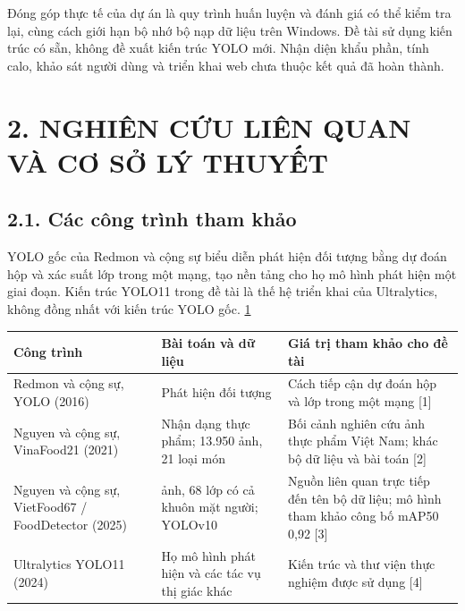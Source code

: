\documentclass[
  vietnamese,
  12pt,
  a4paper,
]{article}
\newcounter{none} %
\begin{document}
\endgroup

Đóng góp thực tế của dự án là quy trình huấn luyện và đánh giá có thể
kiểm tra lại, cùng cách giới hạn bộ nhớ bộ nạp dữ liệu trên Windows. Đề
tài sử dụng kiến trúc có sẵn, không đề xuất kiến trúc YOLO mới. Nhận
diện khẩu phần, tính calo, khảo sát người dùng và triển khai web chưa
thuộc kết quả đã hoàn thành.

\section{2. NGHIÊN CỨU LIÊN QUAN VÀ CƠ SỞ LÝ
THUYẾT}\label{nghiuxean-cux1ee9u-liuxean-quan-vuxe0-cux1a1-sux1edf-luxfd-thuyux1ebft}

\subsection{2.1. Các công trình tham
khảo}\label{cuxe1c-cuxf4ng-truxecnh-tham-khux1ea3o}

YOLO gốc của Redmon và cộng sự biểu diễn phát hiện đối tượng bằng dự
đoán hộp và xác suất lớp trong một mạng, tạo nền tảng cho họ mô hình
phát hiện một giai đoạn. Kiến trúc YOLO11 trong đề tài là thế hệ triển
khai của Ultralytics, không đồng nhất với kiến trúc YOLO gốc.
\href{https://arxiv.org/abs/1506.02640}{1}

\begingroup\small\setlength{\tabcolsep}{4pt}\renewcommand{\arraystretch}{1.12}

{\def\LTcaptype{none} %
\begin{longtable}[]{@{}
  >{\raggedright\arraybackslash}p{}
  >{\raggedright\arraybackslash}p{}
  >{\raggedright\arraybackslash}p{}@{}}
\toprule\noalign{}
\begin{minipage}[b]{\linewidth}\raggedright
Công trình
\end{minipage} & \begin{minipage}[b]{\linewidth}\raggedright
Bài toán và dữ liệu
\end{minipage} & \begin{minipage}[b]{\linewidth}\raggedright
Giá trị tham khảo cho đề tài
\end{minipage} \\
\midrule\noalign{}
\endhead
\bottomrule\noalign{}
\endlastfoot
Redmon và cộng sự, YOLO (2016) & Phát hiện đối tượng & Cách tiếp cận dự
đoán hộp và lớp trong một mạng {[}1{]} \\
Nguyen và cộng sự, VinaFood21 (2021) & Nhận dạng thực phẩm; 13.950 ảnh,
21 loại món & Bối cảnh nghiên cứu ảnh thực phẩm Việt Nam; khác bộ dữ
liệu và bài toán {[}2{]} \\
Nguyen và cộng sự, VietFood67 / FoodDetector (2025) & 33.003 ảnh, 68 lớp
có cả khuôn mặt người; YOLOv10 & Nguồn liên quan trực tiếp đến tên bộ dữ
liệu; mô hình tham khảo công bố mAP50 0,92 {[}3{]} \\
Ultralytics YOLO11 (2024) & Họ mô hình phát hiện và các tác vụ thị giác
khác & Kiến trúc và thư viện thực nghiệm được sử dụng {[}4{]} \\
\end{longtable}
}
\end{document}
